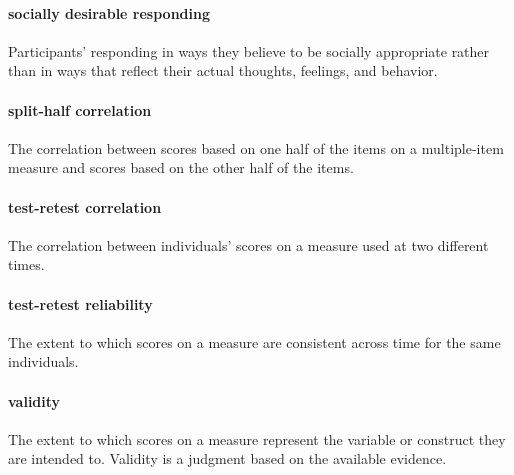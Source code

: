 \documentclass[
]{krantz}
\begin{document}
\hypertarget{socially-desirable-responding}{%
\paragraph*{socially desirable responding}\label{socially-desirable-responding}}

Participants' responding in ways they believe to be socially appropriate rather than in ways that reflect their actual thoughts, feelings, and behavior.

\hypertarget{split-half-correlation}{%
\paragraph*{split-half correlation}\label{split-half-correlation}}

The correlation between scores based on one half of the items on a multiple-item measure and scores based on the other half of the items.

\hypertarget{test-retest-correlation}{%
\paragraph*{test-retest correlation}\label{test-retest-correlation}}

The correlation between individuals' scores on a measure used at two different times.

\hypertarget{test-retest-reliability-1}{%
\paragraph*{test-retest reliability}\label{test-retest-reliability-1}}

The extent to which scores on a measure are consistent across time for the same individuals.

\hypertarget{validity-1}{%
\paragraph*{validity}\label{validity-1}}

The extent to which scores on a measure represent the variable or construct they are intended to. Validity is a judgment based on the available evidence.
\end{document}
